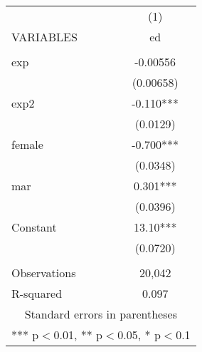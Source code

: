 \begin{tabular}{lc} \hline
 & (1) \\
VARIABLES & ed \\ \hline
 &  \\
exp & -0.00556 \\
 & (0.00658) \\
exp2 & -0.110*** \\
 & (0.0129) \\
female & -0.700*** \\
 & (0.0348) \\
mar & 0.301*** \\
 & (0.0396) \\
Constant & 13.10*** \\
 & (0.0720) \\
 &  \\
Observations & 20,042 \\
 R-squared & 0.097 \\ \hline
\multicolumn{2}{c}{ Standard errors in parentheses} \\
\multicolumn{2}{c}{ *** p$<$0.01, ** p$<$0.05, * p$<$0.1} \\
\end{tabular}
